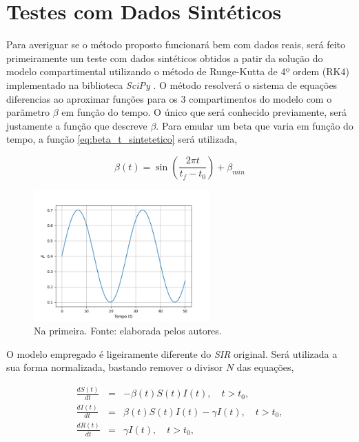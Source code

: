 \section{Testes com Dados Sintéticos}

Para averiguar se o método proposto funcionará bem com dados reais,
será feito primeiramente um teste com dados sintéticos obtidos a patir da solução
do modelo compartimental utilizando o método de Runge-Kutta de 4º ordem (RK4)
implementado na biblioteca \textit{SciPy} \cite{scipy}. O método resolverá 
o sistema de equações diferencias ao aproximar funções para os 3 compartimentos
do modelo  com o parãmetro $\beta$ em função do tempo. O único que 
será conhecido previamente, será justamente a função que descreve $\beta$.
Para emular um beta que varia em função do tempo, 
a função \ref{eq:beta_t_sintetetico} será utilizada,

\begin{equation} \label{eq:beta_t_sintetetico}
    \beta(t) = \sin(\frac{2\pi t}{t_f - t_0})  + \beta_{min}
\end{equation}

\begin{figure}[htpb]
\centering
\includegraphics[width=0.6\textwidth]{figuras/real-beta-sir-nonoise.png}
\caption{Na primeira. Fonte: elaborada pelos autores.}
\label{fig:beta-sir-semruido}
\end{figure}

O modelo empregado é ligeiramente diferente do \textit{SIR} original. 
Será utilizada a sua forma normalizada, bastando remover o divisor $N$
das equações,

\begin{eqnarray}
   \frac{dS(t)}{dt} &=& -\beta(t) S(t) I(t),  \quad t > t_0, \label{eq:SIR-beta-t-1-norm}\\
   \frac{dI(t)}{dt} &=& \beta(t) S(t) I(t) - \gamma I(t), \quad t > t_0, \label{eq:SIR-beta-t-2-norm}\\
   \frac{dR(t)}{dt} &=& \gamma I(t),  \quad t > t_0, \label{eq:SIR-beta-t-3-norm}
\end{eqnarray}

